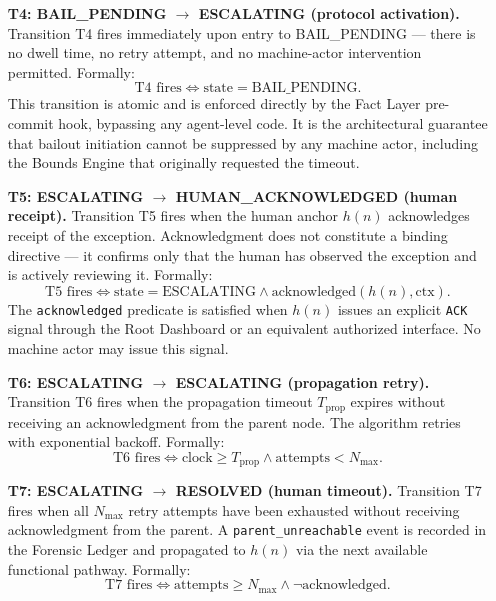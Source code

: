 \begin{enumerate}
\item[\textbf{T4: BAIL\_PENDING $\rightarrow$ ESCALATING (protocol activation).}] Transition T4 fires immediately upon entry to BAIL\_PENDING — there is no dwell time, no retry attempt, and no machine-actor intervention permitted. Formally:
\begin{equation}
\text{T4 fires} \iff \text{state} = \text{BAIL\_PENDING}. \tag{T4}
\end{equation}
This transition is atomic and is enforced directly by the Fact Layer pre-commit hook, bypassing any agent-level code. It is the architectural guarantee that bailout initiation cannot be suppressed by any machine actor, including the Bounds Engine that originally requested the timeout.

\item[\textbf{T5: ESCALATING $\rightarrow$ HUMAN\_ACKNOWLEDGED (human receipt).}] Transition T5 fires when the human anchor $h(n)$ acknowledges receipt of the exception. Acknowledgment does not constitute a binding directive — it confirms only that the human has observed the exception and is actively reviewing it. Formally:
\begin{equation}
\text{T5 fires} \iff \text{state} = \text{ESCALATING} \land \text{acknowledged}(h(n), \text{ctx}). \tag{T5}
\end{equation}
The \texttt{acknowledged} predicate is satisfied when $h(n)$ issues an explicit \texttt{ACK} signal through the Root Dashboard or an equivalent authorized interface. No machine actor may issue this signal.

\item[\textbf{T6: ESCALATING $\rightarrow$ ESCALATING (propagation retry).}] Transition T6 fires when the propagation timeout $T_{\text{prop}}$ expires without receiving an acknowledgment from the parent node. The algorithm retries with exponential backoff. Formally:
\begin{equation}
\text{T6 fires} \iff \text{clock} \geq T_{\text{prop}} \land \text{attempts} < N_{\max}. \tag{T6}
\end{equation}

\item[\textbf{T7: ESCALATING $\rightarrow$ RESOLVED (human timeout).}] Transition T7 fires when all $N_{\max}$ retry attempts have been exhausted without receiving acknowledgment from the parent. A \texttt{parent\_unreachable} event is recorded in the Forensic Ledger and propagated to $h(n)$ via the next available functional pathway. Formally:
\begin{equation}
\text{T7 fires} \iff \text{attempts} \geq N_{\max} \land \neg\text{acknowledged}. \tag{T7}
\end{equation}
\end{enumerate}

